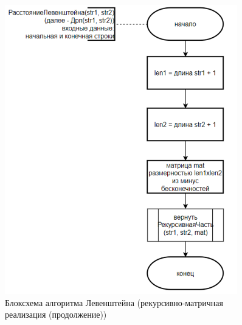 \begin{figure}[H]
    \centering
    \includegraphics[width=0.9\textwidth]{img/block_1_3_2.png}
    \caption{Блоксхема алгоритма Левенштейна (рекурсивно-матричная реализация (продолжение))}
\end{figure}

